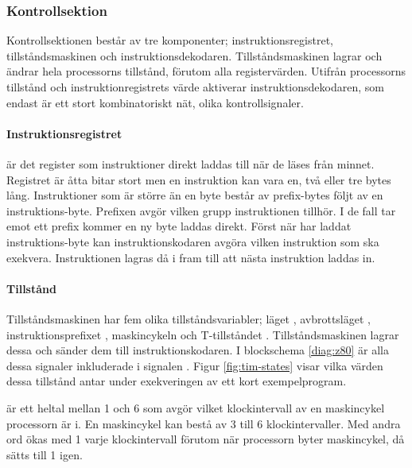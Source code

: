 \documentclass[main.tex]{subfiles}
\begin{document}
\subsubsection{Kontrollsektion}
Kontrollsektionen består av tre komponenter; instruktionsregistret,
tillståndsmaskinen och instruktionsdekodaren. Tillståndsmaskinen lagrar och
ändrar hela processorns tillstånd, förutom alla registervärden. Utifrån
processorns tillstånd och instruktionregistrets värde aktiverar
instruktionsdekodaren, som endast är ett stort kombinatoriskt nät, olika
kontrollsignaler.

\paragraph{Instruktionsregistret }
 är det register som instruktioner direkt laddas till när de läses
från minnet. Registret är åtta bitar stort men en instruktion kan vara en, två
eller tre bytes lång. Instruktioner som är större än en byte består av
prefix-bytes följt av en instruktions-byte. Prefixen avgör vilken grupp
instruktionen tillhör. I de fall  tar emot ett prefix kommer en ny
byte laddas direkt. Först när  har laddat instruktions-byte kan
instruktionskodaren avgöra vilken instruktion som ska exekvera. Instruktionen
lagras då i  fram till att nästa instruktion laddas in.

\paragraph{Tillstånd}
Tillståndsmaskinen har fem olika tillståndsvariabler; läget ,
avbrottsläget , instruktionsprefixet , maskincykeln
 och T-tillståndet . Tillståndsmaskinen lagrar dessa och sänder
dem till instruktionskodaren. I blockschema \ref{diag:z80} är alla dessa
signaler inkluderade i signalen . Figur \ref{fig:tim-states}
visar vilka värden dessa tillstånd antar under exekveringen av ett kort
exempelprogram.

\begin{SCfigure}
    \centering
    
    \caption{Tillstånd samt värdet av  under exekveringen av
    programmet }
    \label{fig:tim-states}
\end{SCfigure}

 är ett heltal mellan 1 och 6 som avgör vilket klockintervall av en
maskincykel processorn är i. En maskincykel kan bestå av 3 till 6
klockintervaller. Med andra ord ökas  med 1 varje klockintervall
förutom när processorn byter maskincykel, då sätts  till 1 igen.
\end{document}
